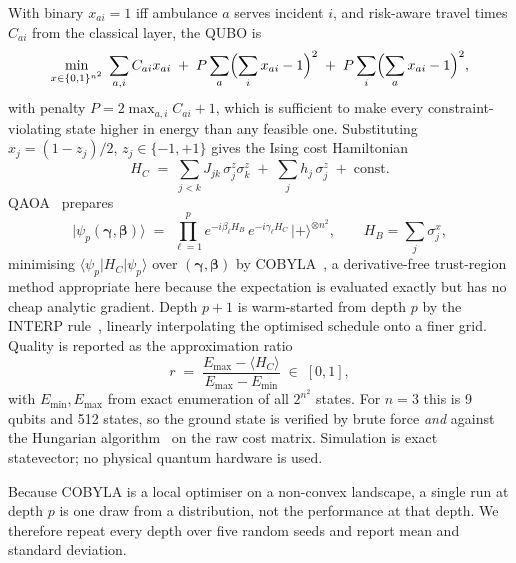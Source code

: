 \documentclass[11pt,a4paper]{article}
\begin{document}
With binary $x_{ai}=1$ iff ambulance $a$ serves incident $i$, and risk-aware
travel times $C_{ai}$ from the classical layer, the QUBO is
\begin{equation}
\min_{x\in\{0,1\}^{n^2}}\;
\sum_{a,i} C_{ai}x_{ai}
\;+\; P\sum_{a}\Bigl(\sum_i x_{ai}-1\Bigr)^{2}
\;+\; P\sum_{i}\Bigl(\sum_a x_{ai}-1\Bigr)^{2},
\label{eq:qubo}
\end{equation}
with penalty $P=2\max_{a,i}C_{ai}+1$, which is sufficient to make every
constraint-violating state higher in energy than any feasible one. Substituting
$x_j=(1-z_j)/2$, $z_j\in\{-1,+1\}$ gives the Ising cost
Hamiltonian~\citep{lucas2014}
\begin{equation}
H_C \;=\; \sum_{j<k} J_{jk}\,\sigma^z_j\sigma^z_k \;+\; \sum_j h_j\,\sigma^z_j
\;+\; \mathrm{const}.
\label{eq:ising}
\end{equation}
QAOA~\citep{farhi2014} prepares
\begin{equation}
\lvert\psi_p(\boldsymbol\gamma,\boldsymbol\beta)\rangle \;=\;
\prod_{\ell=1}^{p} e^{-i\beta_\ell H_B}\,e^{-i\gamma_\ell H_C}\,
\lvert +\rangle^{\otimes n^2},
\qquad H_B=\sum_j \sigma^x_j,
\label{eq:qaoa}
\end{equation}
minimising $\langle\psi_p\lvert H_C\rvert\psi_p\rangle$ over
$(\boldsymbol\gamma,\boldsymbol\beta)$ by COBYLA~\citep{powell1994}, a
derivative-free trust-region method appropriate here because the expectation is
evaluated exactly but has no cheap analytic gradient. Depth $p+1$ is warm-started
from depth $p$ by the INTERP rule~\citep{zhou2020}, linearly interpolating the
optimised schedule onto a finer grid. Quality is reported as the approximation
ratio
\begin{equation}
r \;=\; \frac{E_{\max}-\langle H_C\rangle}{E_{\max}-E_{\min}} \;\in\; [0,1],
\label{eq:ratio}
\end{equation}
with $E_{\min},E_{\max}$ from exact enumeration of all $2^{n^2}$ states. For
$n=3$ this is 9 qubits and 512 states, so the ground state is verified by brute
force \emph{and} against the Hungarian algorithm~\citep{kuhn1955} on the raw cost
matrix. Simulation is exact statevector; no physical quantum hardware is used.

Because COBYLA is a local optimiser on a non-convex landscape, a single run at
depth $p$ is one draw from a distribution, not the performance at that
depth. We therefore repeat every depth over five random seeds and report mean and
standard deviation.
\end{document}
